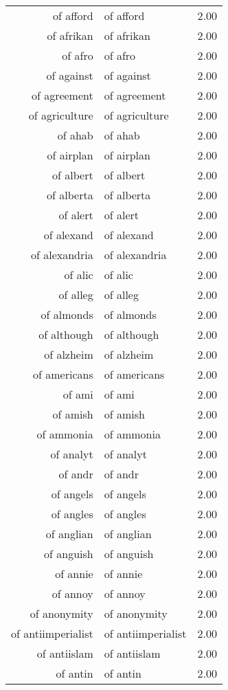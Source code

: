 \begin{table}[ht]
\begin{tabular}{rlr}
  of afford & of afford & 2.00 \\ 
  of afrikan & of afrikan & 2.00 \\ 
  of afro & of afro & 2.00 \\ 
  of against & of against & 2.00 \\ 
  of agreement & of agreement & 2.00 \\ 
  of agriculture & of agriculture & 2.00 \\ 
  of ahab & of ahab & 2.00 \\ 
  of airplan & of airplan & 2.00 \\ 
  of albert & of albert & 2.00 \\ 
  of alberta & of alberta & 2.00 \\ 
  of alert & of alert & 2.00 \\ 
  of alexand & of alexand & 2.00 \\ 
  of alexandria & of alexandria & 2.00 \\ 
  of alic & of alic & 2.00 \\ 
  of alleg & of alleg & 2.00 \\ 
  of almonds & of almonds & 2.00 \\ 
  of although & of although & 2.00 \\ 
  of alzheim & of alzheim & 2.00 \\ 
  of americans & of americans & 2.00 \\ 
  of ami & of ami & 2.00 \\ 
  of amish & of amish & 2.00 \\ 
  of ammonia & of ammonia & 2.00 \\ 
  of analyt & of analyt & 2.00 \\ 
  of andr & of andr & 2.00 \\ 
  of angels & of angels & 2.00 \\ 
  of angles & of angles & 2.00 \\ 
  of anglian & of anglian & 2.00 \\ 
  of anguish & of anguish & 2.00 \\ 
  of annie & of annie & 2.00 \\ 
  of annoy & of annoy & 2.00 \\ 
  of anonymity & of anonymity & 2.00 \\ 
  of antiimperialist & of antiimperialist & 2.00 \\ 
  of antiislam & of antiislam & 2.00 \\ 
  of antin & of antin & 2.00 \\ 

\end{tabular}
\end{table}
